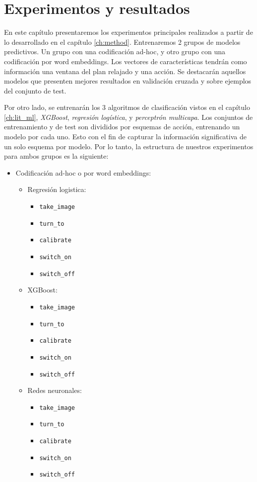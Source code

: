 \chapter{Experimentos y resultados}
\label{ch:results}

En este capítulo presentaremos los experimentos principales realizados a partir
de lo desarrollado en el capítulo \ref{ch:method}. Entrenaremos 2 grupos de
modelos predictivos. Un grupo con una codificación ad-hoc, y otro grupo con una
codificación por word embeddings. Los vectores de características tendrán como
información una ventana del plan relajado y una acción. Se destacarán aquellos
modelos que presenten mejores resultados en validación cruzada y sobre ejemplos
del conjunto de test.

Por otro lado, se entrenarán los 3 algoritmos de clasificación vistos en el
capítulo \ref{ch:lit_ml}, \emph{XGBoost}, \emph{regresión logística}, y
\emph{perceptrón multicapa}. Los conjuntos de entrenamiento y de test son
divididos por esquemas de acción, entrenando un modelo por cada uno. Esto con el
fin de capturar la información significativa de un solo esquema por modelo. Por
lo tanto, la estructura de nuestros experimentos para ambos grupos es la
siguiente:

\begin{itemize}
    \item Codificación ad-hoc o por word embeddings:
    \begin{itemize}
        \item Regresión logistica:
        \begin{itemize}
            \item \verb|take_image|
            \item \verb|turn_to|
            \item \verb|calibrate|
            \item \verb|switch_on|
            \item \verb|switch_off|
        \end{itemize}
        \item XGBoost:
        \begin{itemize}
            \item \verb|take_image|
            \item \verb|turn_to|
            \item \verb|calibrate|
            \item \verb|switch_on|
            \item \verb|switch_off|
        \end{itemize}
        \item Redes neuronales:
        \begin{itemize}
            \item \verb|take_image|
            \item \verb|turn_to|
            \item \verb|calibrate|
            \item \verb|switch_on|
            \item \verb|switch_off|
        \end{itemize}
    \end{itemize}
\end{itemize}

